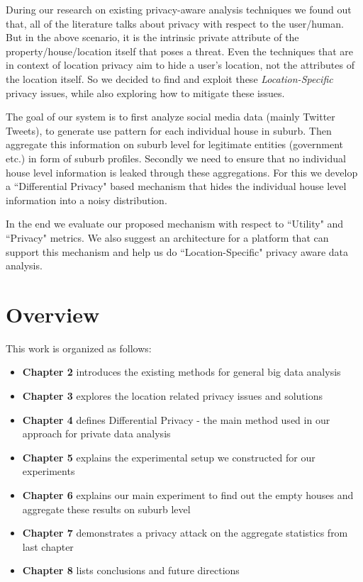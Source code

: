 \documentclass[12pt]{report}
\theoremstyle{named}
\begin{document}
During our research on existing privacy-aware analysis techniques we found out that, all of the literature talks about privacy with respect to the user/human. But in the above scenario, it is the intrinsic private attribute of the property/house/location itself that poses a threat. Even the techniques that are in context of location privacy aim to hide a user's location, not the attributes of the location itself. So we decided to find and exploit these \textit{Location-Specific} privacy issues, while also exploring how to mitigate these issues.

The goal of our system is to first analyze social media data (mainly Twitter Tweets), to generate use pattern for each individual house in suburb. Then aggregate this information on suburb level for legitimate entities (government etc.) in form of suburb profiles. Secondly we need to ensure that no individual house level information is leaked through these aggregations. For this we develop a ``Differential Privacy" based mechanism that hides the individual house level information into a noisy distribution.

In the end we evaluate our proposed mechanism with respect to ``Utility" and ``Privacy" metrics. We also suggest an architecture for a platform that can support this mechanism and help us do ``Location-Specific" privacy aware data analysis.
\section{Overview}
This work is organized as follows:

\begin{itemize}
  \item \textbf{Chapter 2} introduces the existing methods for general big data analysis 
  \item \textbf{Chapter 3} explores the location related privacy issues and solutions
  \item \textbf{Chapter 4} defines Differential Privacy - the main method used in our approach for private data analysis
  \item \textbf{Chapter 5} explains the experimental setup we constructed for our experiments
  \item \textbf{Chapter 6} explains our main experiment to find out the empty houses and aggregate these results on suburb level
  \item \textbf{Chapter 7} demonstrates a privacy attack on the aggregate statistics from last chapter
  \item \textbf{Chapter 8} lists conclusions and future directions
\end{itemize}
\end{document}
